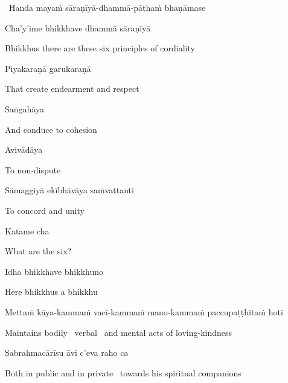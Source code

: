 \begin{leader}
  \anglebracketleft\ \hspace{-0.5mm}Handa mayaṁ sāraṇīyā-dhammā-pāṭhaṁ bhaṇāmase \hspace{-0.5mm}\anglebracketright\
\end{leader}

Cha'y'ime bhikkhave dhammā sāraṇīyā

\begin{english}
  Bhikkhus there are these six principles of cordiality
\end{english}

Piyakaraṇā garukaraṇā

\begin{english}
  That create endearment and respect
\end{english}

Saṅgahāya

\begin{english}
  And conduce to cohesion
\end{english}

Avivādāya

\begin{english}
  To non-dispute
\end{english}

Sāmaggiyā ekībhāvāya saṁvattanti

\begin{english}
  To concord and unity
\end{english}

Katame cha

\begin{english}
  What are the six?
\end{english}

Idha bhikkhave bhikkhuno

\begin{english}
  Here bhikkhus a bhikkhu
\end{english}

\begin{pali-hang}
  Mettaṁ kāya-kammaṁ vacī-kammaṁ mano-kammaṁ paccupaṭṭhitaṁ hoti
\end{pali-hang}

\begin{english-hang}
  Maintains bodily \breathmark\ verbal \breathmark\ and mental acts of loving-kindness
\end{english-hang}

Sabrahmacārīsu āvi c'eva raho ca

\begin{english}
  Both in public and in private \breathmark\ towards his spiritual companions
\end{english}

